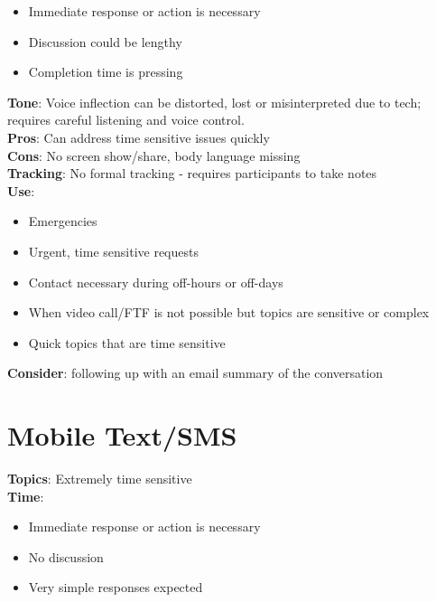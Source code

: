 \documentclass[
  letterpaper,
  DIV=11,
  numbers=noendperiod]{scrreprt}
\providecommand{\tightlist}{%
  \setlength{\itemsep}{0pt}\setlength{\parskip}{0pt}}\usepackage{longtable,booktabs,array}
\begin{document}
\begin{itemize}
\tightlist
\item
  Immediate response or action is necessary\\
\item
  Discussion could be lengthy\\
\item
  Completion time is pressing
\end{itemize}

\textbf{Tone}: Voice inflection can be distorted, lost or misinterpreted
due to tech; requires careful listening and voice control.\\
\textbf{Pros}: Can address time sensitive issues quickly\\
\textbf{Cons}: No screen show/share, body language missing\\
\textbf{Tracking}: No formal tracking - requires participants to take
notes\\
\textbf{Use}:

\begin{itemize}
\tightlist
\item
  Emergencies\\
\item
  Urgent, time sensitive requests\\
\item
  Contact necessary during off-hours or off-days\\
\item
  When video call/FTF is not possible but topics are sensitive or
  complex\\
\item
  Quick topics that are time sensitive
\end{itemize}

\textbf{Consider}: following up with an email summary of the
conversation

\hypertarget{mobile-textsms}{%
\section{Mobile Text/SMS}\label{mobile-textsms}}

\textbf{Topics}: Extremely time sensitive\\
\textbf{Time}:

\begin{itemize}
\tightlist
\item
  Immediate response or action is necessary
\item
  No discussion
\item
  Very simple responses expected
\end{itemize}
\end{document}
